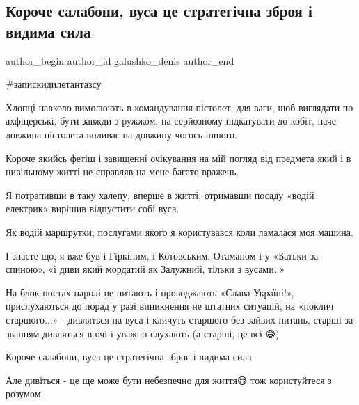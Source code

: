  
 
 
 
 

\subsection{Короче салабони, вуса це стратегічна зброя і видима сила}
\label{sec:20_12_2022.fb.galushko_denis.1.koroche_salaboni__vu}

\ifcmt
 author_begin
   author_id galushko_denis
 author_end
\fi

\#запискидилетантазсу

Хлопці навколо вимолюють в командування пістолет, для ваги, щоб виглядати по
ахфіцерські, бути завжди з ружжом, на серйозному  підкатувати до кобіт, наче
довжина  пістолета  впливає  на довжину  чогось  іншого.   

Короче якийсь фетіш і завищенні очікування на мій погляд від предмета який і в
цивільному житті не справляв на мене багато вражень. 

Я потрапивши в таку халепу,  вперше в житті, отримавши посаду «водій електрик»
вирішив відпустити собі вуса.

Як водій маршрутки, послугами якого я користувався коли ламалася моя машина.

І знаєте що, я вже був і Гіркіним, і Котовським, Отаманом і у «Батьки за
спиною», «і диви який мордатий як Залужний, тільки з вусами..»

На блок постах паролі не питають і проводжають «Слава Україні!», прислухаються
до порад у разі виникнення не штатних ситуацій, на «поклич старшого...» -
дивляться на вуса і кличуть старшого без зайвих питань, старші за званням
дивляться в очі і уважно слухають (а старші, це всі 😅) 

Короче салабони, вуса це стратегічна зброя і видима сила🤝🇺🇦

Але дивіться - це ще може бути небезпечно для життя😅 тож користуйтеся з
розумом.

